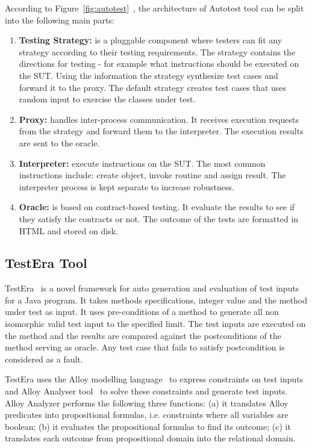 \noindent According to Figure~\ref{fig:autotest}~\cite{Leitner2007}, the architecture of Autotest tool can be split into the following main parts:
\begin{enumerate}
\item \textbf{Testing Strategy:} is a pluggable component where testers can fit any strategy according to their testing requirements. The strategy contains the directions for testing - for example what instructions should be executed on the SUT. Using the information the strategy synthesize test cases and forward it to the proxy. The default strategy creates test cases that uses random input to exercise the classes under test.
\item \textbf{Proxy:} handles inter-process communication. It receives execution requests from the strategy and forward them to the interpreter. The execution results are sent to the oracle.
\item \textbf{Interpreter:} execute instructions on the SUT. The most common instructions include: create object, invoke routine and assign result. The interpreter process is kept separate to increase robustness.
\item \textbf{Oracle:} is based on contract-based testing. It evaluate the results to see if they satisfy the contracts or not. The outcome of the tests are formatted in HTML and stored on disk.
\end{enumerate}

\subsection{TestEra Tool}
TestEra~\cite{Khurshid2004} is a novel framework for auto generation and evaluation of test inputs for a Java program. It takes methods specifications, integer value and the method under test as input. It uses pre-conditions of a method to generate all non isomorphic valid test input to the specified limit. The test inputs are executed on the method and the results are compared against the postconditions of the method serving as oracle. Any test case that fails to satisfy postcondition is considered as a fault. 

TestEra uses the Alloy modelling language~\cite{jackson2001micromodularity} to express constraints on test inputs and Alloy Analyser tool~\cite{jackson2000alcoa} to solve these constraints and generate test inputs. Alloy Analyzer performs the following three functions: (a) it translates Alloy predicates into propositional formulas, i.e. constraints where all variables are boolean; (b) it evaluates the propositional formulas to find its outcome; (c) it translates each outcome from propositional domain into the relational domain.

